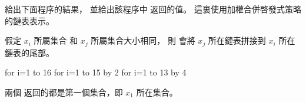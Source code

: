 \startEXERCISE[exercise:19.2-2]
給出下面程序的結果，
並給出該程序中  返回的值。
這裏使用加權合併啓發式策略的鏈表表示。

假定 $x_i$ 所屬集合 和 $x_j$ 所屬集合大小相同，
則  會將 $x_j$ 所在鏈表拼接到 $x_i$ 所在鏈表的尾部。
\stopEXERCISE

\startCLRSCODE
for i=1 to 16
for i=1 to 15 by 2
for i=1 to 13 by 4
\stopCLRSCODE

\startANSWER
兩個  返回的都是第一個集合，即 $x_1$ 所在集合。

{
\txx
{}
}
\stopANSWER